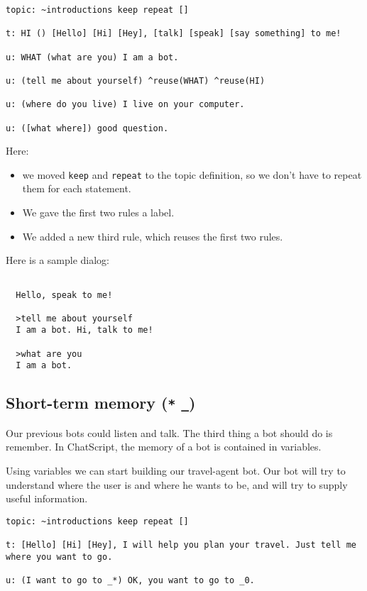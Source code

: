 \documentclass[]{article}
\providecommand{\tightlist}{%
  \setlength{\itemsep}{0pt}\setlength{\parskip}{0pt}}
\begin{document}
\begin{verbatim}
topic: ~introductions keep repeat []

t: HI () [Hello] [Hi] [Hey], [talk] [speak] [say something] to me!

u: WHAT (what are you) I am a bot.

u: (tell me about yourself) ^reuse(WHAT) ^reuse(HI)

u: (where do you live) I live on your computer.

u: ([what where]) good question.
\end{verbatim}

Here:

\begin{itemize}
\tightlist
\item
  we moved \texttt{keep} and \texttt{repeat} to the topic definition, so
  we don't have to repeat them for each statement.
\item
  We gave the first two rules a label.
\item
  We added a new third rule, which reuses the first two rules.
\end{itemize}

Here is a sample dialog:

\begin{verbatim}

  Hello, speak to me!

  >tell me about yourself
  I am a bot. Hi, talk to me!

  >what are you
  I am a bot.
\end{verbatim}

\subsection{\texorpdfstring{Short-term memory (\texttt{*}
\texttt{\_})}{Short-term memory (* \_)}}\label{short-term-memory-_}

Our previous bots could listen and talk. The third thing a bot should do
is remember. In ChatScript, the memory of a bot is contained in
variables.

Using variables we can start building our travel-agent bot. Our bot will
try to understand where the user is and where he wants to be, and will
try to supply useful information.

\begin{verbatim}
topic: ~introductions keep repeat []

t: [Hello] [Hi] [Hey], I will help you plan your travel. Just tell me where you want to go.

u: (I want to go to _*) OK, you want to go to _0. 
\end{verbatim}
\end{document}
